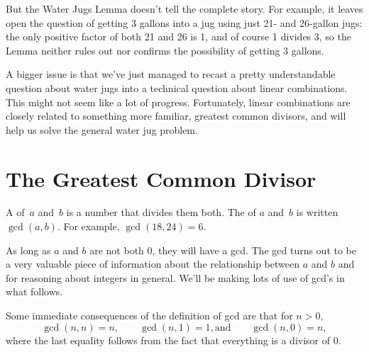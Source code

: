 But the Water Jugs Lemma doesn't tell the complete story.  For
example, it leaves open the question of getting 3 gallons into a jug
using just 21- and 26-gallon jugs: the only positive factor of both 21
and 26 is 1, and of course 1 divides 3, so the Lemma neither rules out
nor confirms the possibility of getting 3 gallons.

A bigger issue is that we've just managed to recast a pretty
understandable question about water jugs into a technical question
about linear combinations.  This might not seem like a lot of
progress.  Fortunately, linear combinations are closely related to
something more familiar, greatest common divisors, and
will help us solve the general water jug problem.

\begin{problems}
\practiceproblems
{}

\classproblems
{}

\end{problems}

\section{The Greatest Common Divisor}\label{sec:gcd}

A  of~$a$ and~$b$ is a number that divides them
both.  The  of $a$ and~$b$ is written
 $\gcd(a, b)$.  For example, $\gcd(18, 24) = 6$.

As long as $a$ and $b$ are not both 0, they will have a gcd. The gcd
turns out to be a very valuable piece of information about the
relationship between $a$ and $b$ and for reasoning about integers in
general.  We'll be making lots of use of gcd's in what follows.

Some immediate consequences of the definition of gcd are that for $n > 0$,
\[
\gcd(n, n) = n, \qquad \gcd(n, 1) = 1, \text{and} \qquad  \gcd(n,0) = n,
\]
where the last equality follows from the fact that everything is a
divisor of 0.

